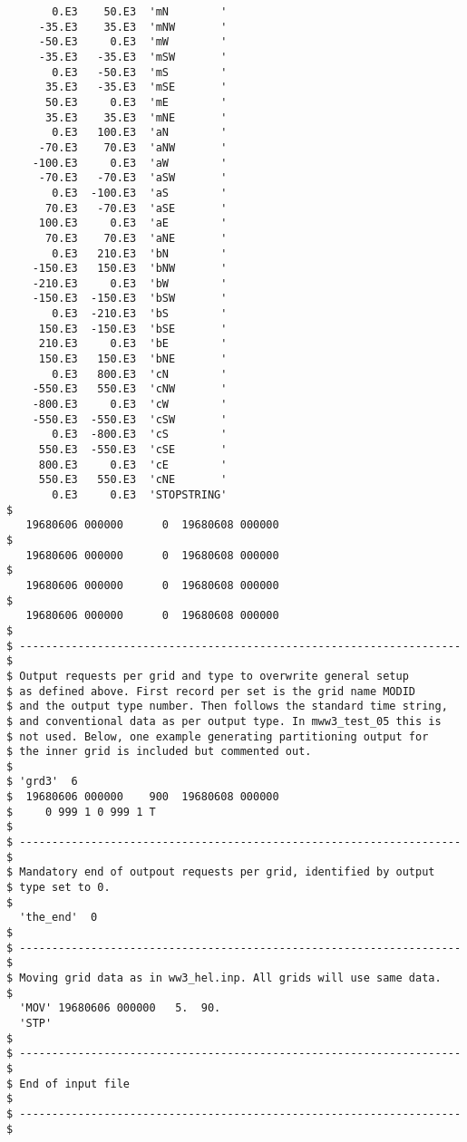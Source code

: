 \begin{verbatim}
       0.E3    50.E3  'mN        '
     -35.E3    35.E3  'mNW       '
     -50.E3     0.E3  'mW        '
     -35.E3   -35.E3  'mSW       '
       0.E3   -50.E3  'mS        '
      35.E3   -35.E3  'mSE       '
      50.E3     0.E3  'mE        '
      35.E3    35.E3  'mNE       '
       0.E3   100.E3  'aN        '
     -70.E3    70.E3  'aNW       '
    -100.E3     0.E3  'aW        '
     -70.E3   -70.E3  'aSW       '
       0.E3  -100.E3  'aS        '
      70.E3   -70.E3  'aSE       '
     100.E3     0.E3  'aE        '
      70.E3    70.E3  'aNE       '
       0.E3   210.E3  'bN        '
    -150.E3   150.E3  'bNW       '
    -210.E3     0.E3  'bW        '
    -150.E3  -150.E3  'bSW       '
       0.E3  -210.E3  'bS        '
     150.E3  -150.E3  'bSE       '
     210.E3     0.E3  'bE        '
     150.E3   150.E3  'bNE       '
       0.E3   800.E3  'cN        '
    -550.E3   550.E3  'cNW       '
    -800.E3     0.E3  'cW        '
    -550.E3  -550.E3  'cSW       '
       0.E3  -800.E3  'cS        '
     550.E3  -550.E3  'cSE       '
     800.E3     0.E3  'cE        '
     550.E3   550.E3  'cNE       '
       0.E3     0.E3  'STOPSTRING'
$
   19680606 000000      0  19680608 000000
$
   19680606 000000      0  19680608 000000
$
   19680606 000000      0  19680608 000000
$
   19680606 000000      0  19680608 000000
$
$ -------------------------------------------------------------------- $
$ Output requests per grid and type to overwrite general setup
$ as defined above. First record per set is the grid name MODID
$ and the output type number. Then follows the standard time string,
$ and conventional data as per output type. In mww3_test_05 this is
$ not used. Below, one example generating partitioning output for 
$ the inner grid is included but commented out.
$
$ 'grd3'  6
$  19680606 000000    900  19680608 000000
$     0 999 1 0 999 1 T 
$
$ -------------------------------------------------------------------- $
$ Mandatory end of outpout requests per grid, identified by output 
$ type set to 0.
$
  'the_end'  0
$
$ -------------------------------------------------------------------- $
$ Moving grid data as in ww3_hel.inp. All grids will use same data.
$
  'MOV' 19680606 000000   5.  90.
  'STP'
$
$ -------------------------------------------------------------------- $
$ End of input file                                                    $
$ -------------------------------------------------------------------- $
\end{verbatim}
